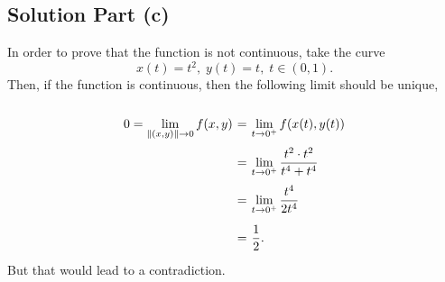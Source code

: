\subsection*{Solution Part (c)}

In order to prove that the function is not continuous, take the curve
\[ x(t) = t^2,\; y(t) = t,\; t\in (0,1). \]
Then, if the function is continuous, then the following limit should be unique,
\[ \everymath{\displaystyle}
\arraycolsep=1.8pt\def\arraystretch{2.5}
\begin{array}{rcl}
    0 = \lim_{\|(x,y)\|\to 0} f(x,y) & = & \lim_{t \to 0^+} f(x(t),y(t))\\
    & = & \lim_{t \to 0^+} \frac{t^2\cdot t^2}{t^4+ t^4} \\
    & = & \lim_{t \to 0^+} \frac{t^4}{2t^4} \\
    & = & \frac{1}{2}.
\end{array} \]
But that would lead to a contradiction.



